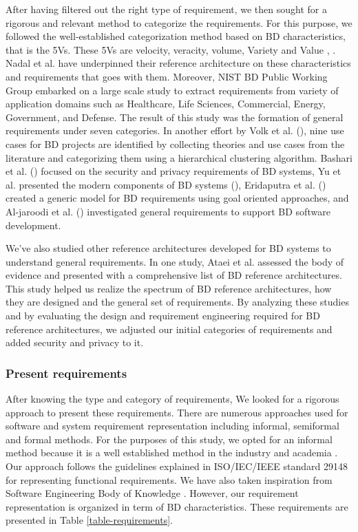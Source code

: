 \documentclass[review]{elsarticle}
\begin{document}
After having filtered out the right type of requirement, we then sought for a rigorous and relevant method to categorize the requirements. For this purpose, we followed the well-established categorization method based on BD characteristics, that is the 5Vs. These 5Vs are velocity, veracity, volume, Variety and Value \cite{Bughin2016}, \cite{rad2017big}. Nadal et al. \cite{nadal2017software} have underpinned their reference architecture on these characteristics and requirements that goes with them. Moreover, NIST BD Public Working Group embarked on a large scale study to extract requirements from variety of application domains such as Healthcare, Life Sciences, Commercial, Energy, Government, and Defense. The result of this study was the formation of general requirements under seven categories. In another effort by Volk et al. (\cite{volk2020identifying}), nine use cases for BD projects are identified by collecting theories and use cases from the literature and categorizing them using a hierarchical clustering algorithm. Bashari et al. (\cite{bashari2016security}) focused on the security and privacy requirements of BD systems, Yu et al. presented the modern components of BD systems (\cite{yu2019components}), Eridaputra et al. (\cite{eridaputra2014modeling}) created a generic model for BD requirements using goal oriented approaches, and Al-jaroodi et al. (\cite{al2016characteristics}) investigated general requirements to support BD software development. 

We've also studied other reference architectures developed for BD systems to understand general requirements. In one study, Ataei et al. \cite{ataei2020big} assessed the body of evidence and presented with a comprehensive list of BD reference architectures. This study helped us realize the spectrum of BD reference architectures, how they are designed and the general set of requirements. By analyzing these studies and by evaluating the design and requirement engineering required for BD reference architectures, we adjusted our initial categories of requirements and added security and privacy to it.

\subsubsection{Present requirements}
After knowing the type and category of requirements, We looked for a rigorous approach to present these requirements. There are numerous approaches used for software and system requirement representation including informal, semiformal and formal methods. For the purposes of this study, we opted for an informal method because it is a well established method in the industry and academia \cite{kassab2014state}. Our approach follows the guidelines explained in ISO/IEC/IEEE standard 29148 \cite{ISO29148} for representing functional requirements. We have also taken inspiration from Software Engineering Body of Knowledge \cite{abran2004software}. However, our requirement representation is organized in term of BD characteristics. These requirements are presented in Table \ref{table-requirements}.
\end{document}
